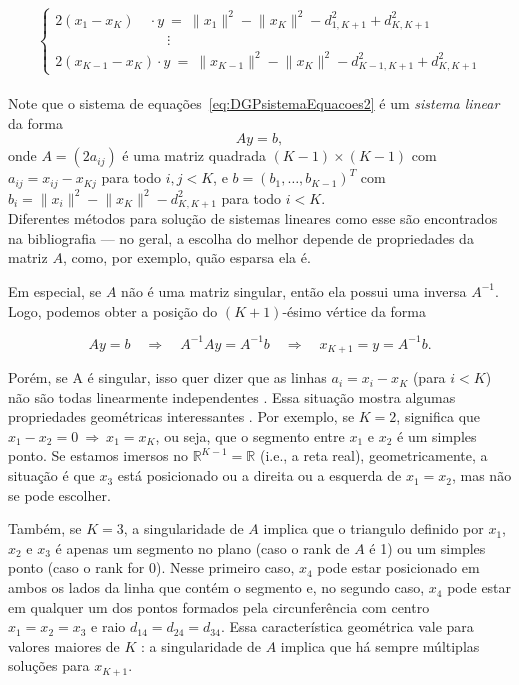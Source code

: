 \begin{equation}
\begin{cases} 
2(x_1-x_K) \quad\cdot y \ = \ \lVert x_1\rVert^2 - \lVert x_K\rVert^2 - d^2_{1,K+1} + d^2_{K,K+1} 
\\
\qquad\qquad\qquad\qquad\!\!\!\vdots
\\
2(x_{K-1}-x_K) \cdot y \ = \ \lVert x_{K-1}\rVert^2 - \lVert x_K\rVert^2 - d^2_{K-1,K+1} + d^2_{K,K+1} 
\end{cases}
\label{eq:DGPsistemaEquacoes2}
\end{equation}
\\

Note que o sistema de equações~\ref{eq:DGPsistemaEquacoes2} é um \textit{sistema linear} da forma 
\begin{equation}
	Ay=b,
	\label{eq:DGPLinearSystem}
\end{equation}
onde $A = (2a_{ij})$ é uma matriz quadrada $(K-1) \times (K-1)$ com $a_{ij} = x_{ij} - x_{Kj}$ para todo $i,j < K$, e $b = (b_1, \dots, b_{K-1})^T$ com $b_i = \lVert x_i\rVert^2 - \lVert x_K\rVert^2 - d^2_{K,K+1}$ para todo $i<K$. 
\\

Diferentes métodos para solução de sistemas lineares como esse são encontrados na bibliografia \cite{AlgebraLinearElon, libertiEDG} --- no geral, a escolha do melhor depende de propriedades da matriz $A$, como, por exemplo, quão esparsa ela é. 

Em especial, se $A$ não é uma matriz singular, então ela possui uma inversa $A^{-1}$. Logo, podemos obter a posição do $(K+1)$-ésimo vértice da forma

\begin{equation}
	Ay = b \quad \Rightarrow \quad A^{-1}Ay = A^{-1}b \quad \Rightarrow \quad x_{K+1} = y = A^{-1}b.
\end{equation}

Porém, se A é singular, isso quer dizer que as linhas $a_i = x_i - x_K$ (para $i<K$) não são todas linearmente independentes \cite{AlgebraLinearElon}. Essa situação mostra algumas propriedades geométricas interessantes \cite{libertiEDG}. Por exemplo, se $K=2$, significa que $x_1 - x_2 = 0 \ \Rightarrow \  x_1 = x_K$, ou seja, que o segmento entre $x_1$ e $x_2$ é um simples ponto. Se estamos imersos no $\mathbb{R}^{K-1} = \mathbb{R}$ (i.e., a reta real), geometricamente, a situação é que $x_3$ está posicionado ou a direita ou a esquerda de $x_1 = x_2$, mas não se pode escolher.

Também, se $K = 3$, a singularidade de $A$ implica que o triangulo definido por $x_1$, $x_2$ e $x_3$ é apenas um segmento no plano (caso o rank de $A$ é 1) ou um simples ponto (caso o rank for 0). Nesse primeiro caso, $x_4$ pode estar posicionado em ambos os lados da linha que contém o segmento e, no segundo caso, $x_4$ pode estar em qualquer um dos pontos formados pela circunferência com centro $x_1 = x_2 = x_3$ e raio $d_{14} = d_{24} = d_{34}$. Essa característica geométrica vale para valores maiores de $K$ \cite{libertiEDG}: a singularidade de $A$ implica que há sempre múltiplas soluções para $x_{K+1}$.\\


